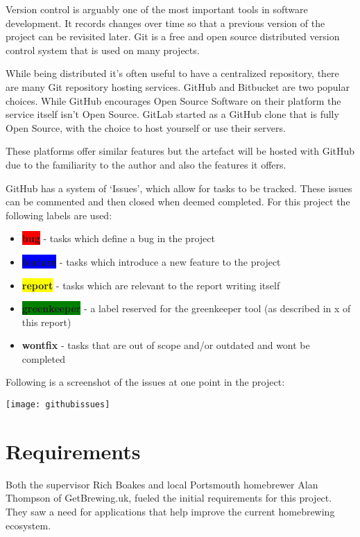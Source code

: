 Version control is arguably one of the most important tools in software development. It records changes over time so that a previous version of the project can be revisited later. Git is a free and open source distributed version control system that is used on many projects. \cite{git}

While being distributed it's often useful to have a centralized repository, there are many Git repository hosting services. GitHub and Bitbucket are two popular choices. While GitHub encourages Open Source Software on their platform the service itself isn't Open Source. \cite{github} GitLab started as a GitHub clone that is fully Open Source, with the choice to host yourself or use their servers. \cite{gitlab} \cite{bitbucket}

These platforms offer similar features but the artefact will be hosted with GitHub due to the familiarity to the author and also the features it offers.

GitHub has a system of `Issues', which allow for tasks to be tracked. These issues can be commented and then closed when deemed completed. For this project the following labels are used:

\begin{itemize}
  \item \textbf{\colorbox{red}{bug}} - tasks which define a bug in the project
  \item \textbf{\colorbox{blue}{feature}} -  tasks which introduce a new feature to the project
  \item \textbf{\colorbox{yellow}{report}} - tasks which are relevant to the report writing itself
  \item \textbf{\colorbox{green}{greenkeeper}} - a label reserved for the greenkeeper tool (as described in x of this report)
  \item \textbf{wontfix} - tasks that are out of scope and/or outdated and wont be completed
\end{itemize}

Following is a screenshot of the issues at one point in the project:

\texttt{[image: githubissues]}

\section{Requirements} \label{a-d--requirements}

Both the supervisor Rich Boakes and local Portsmouth homebrewer Alan Thompson of GetBrewing.uk, fueled the initial requirements for this project. They saw a need for applications that help improve the current homebrewing ecosystem.

